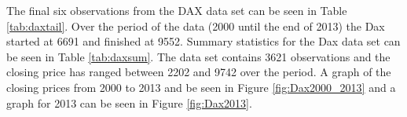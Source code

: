 The final six observations from the DAX data set can be seen in Table \ref{tab:daxtail}. Over the period of the data (2000 until the end of 2013) the Dax started at 6691 and finished at 9552. Summary statistics for the Dax data set can be seen in Table \ref{tab:daxsum}. The data set contains 3621 observations and the closing price has ranged between 2202 and 9742 over the period. A graph of the closing prices from 2000 to 2013 and be seen in Figure \ref{fig:Dax2000_2013} and a graph for 2013 can be seen in Figure \ref{fig:Dax2013}.











